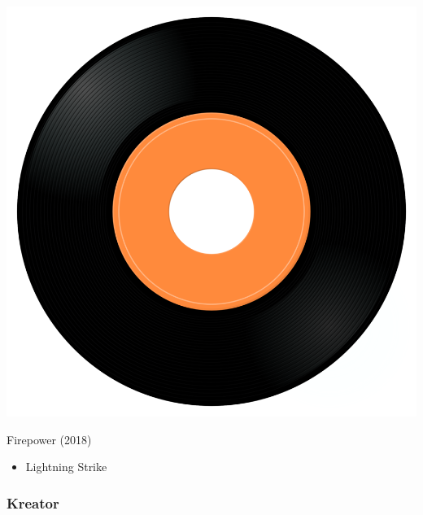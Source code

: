 \begin{minipage}[t]{0.25\textwidth}\vspace{0pt}
\captionsetup{type=figure}
\includegraphics[width=\textwidth]{Images/cover.png}
\caption*{Firepower (2018)}
\end{minipage}
\begin{minipage}[t]{0.25\textwidth}\vspace{0pt}
\begin{itemize}[nosep,leftmargin=1em,labelwidth=*,align=left]
	\setlength{\itemsep}{0pt}
	\item Lightning Strike
\end{itemize}
\end{minipage}

\subsubsection{Kreator}

